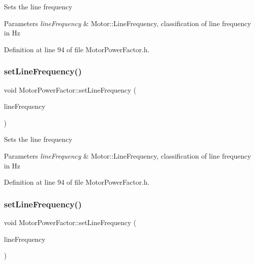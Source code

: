 Sets the line frequency 
\begin{DoxyParams}{Parameters}
{\em line\+Frequency} & Motor\+::\+Line\+Frequency, classification of line frequency in Hz \\
\hline
\end{DoxyParams}


Definition at line 94 of file Motor\+Power\+Factor.\+h.

\mbox{\label{class_motor_power_factor_a5186ccae4191cfc5b2b7c3bdbd166563}} 
\subsubsection{\texorpdfstring{set\+Line\+Frequency()}{setLineFrequency()}\hspace{0.1cm}{\footnotesize\ttfamily [2/3]}}
{\footnotesize\ttfamily void Motor\+Power\+Factor\+::set\+Line\+Frequency (\begin{DoxyParamCaption}\item[{Motor\+::\+Line\+Frequency}]{line\+Frequency }\end{DoxyParamCaption})\hspace{0.3cm}{\ttfamily [inline]}}

Sets the line frequency 
\begin{DoxyParams}{Parameters}
{\em line\+Frequency} & Motor\+::\+Line\+Frequency, classification of line frequency in Hz \\
\hline
\end{DoxyParams}


Definition at line 94 of file Motor\+Power\+Factor.\+h.

\mbox{\label{class_motor_power_factor_a5186ccae4191cfc5b2b7c3bdbd166563}} 
\subsubsection{\texorpdfstring{set\+Line\+Frequency()}{setLineFrequency()}\hspace{0.1cm}{\footnotesize\ttfamily [3/3]}}
{\footnotesize\ttfamily void Motor\+Power\+Factor\+::set\+Line\+Frequency (\begin{DoxyParamCaption}\item[{Motor\+::\+Line\+Frequency}]{line\+Frequency }\end{DoxyParamCaption})\hspace{0.3cm}{\ttfamily [inline]}}


